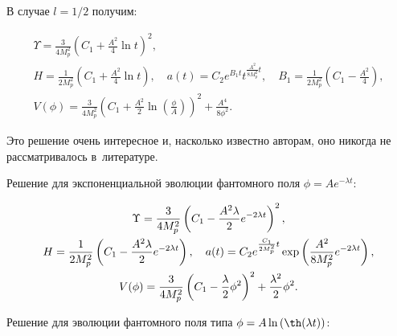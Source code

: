 %

В случае $l=1/2$ получим:%

\begin{gather*}

\Upsilon=\frac{3}{4M_p^2}\left(C_1+\frac{A^2}{4}\ln t\right)^2,\\

H=\frac{1}{2M_p^2}\left(C_1 +\frac{A^2}{4}\ln t\right), \quad 

a(t)=C_2 e^{B_1t}t^{\frac{A^2}{8M_p^2}t},\quad B_1=\frac{1}{2M_p^2}\left(C_1-\frac{A^2}{4}\right),\\

V(\phi)=\frac{3}{4M_p^2}\left(C_1 + \frac{A^2}{2}

\ln\left(\frac{\phi}{A}\right)\right)^2+\frac{A^4}{8\phi^2}.

\end{gather*}

Это решение очень интересное и, насколько известно авторам, оно никогда не рассматривалось в~литературе.





Решение для экспоненциальной эволюции фантомного поля $ \phi = A e^{-\lambda t} $:

\begin{gather}

\notag


\Upsilon=\frac{3}{4M_p^2}\left(C_1

-\frac{A^2\lambda}{2}e^{-2\lambda t}\right)^2,\\

\notag


 H=\frac{1}{2M_p^2}\left(C_1 -\frac{A^2\lambda}{2}e^{-2\lambda t}

\right),\quad  a(t)=C_2 e^{\frac{C_1}{2M_p^2}t}\exp \left(\frac{A^2}{8M_p^2}e^{-2\lambda t}\right),

\\

 \label{equ:cher:exp3}%

 V(\phi)=\frac{3}{4M_p^2}\left(C_1

-\frac{\lambda}{2}\phi^2\right)^2+\frac{\lambda^2}{2}\phi^2.

\end{gather}





Решение для эволюции фантомного поля типа $ \phi=A\ln \left(\th (\lambda t)\right) $:

